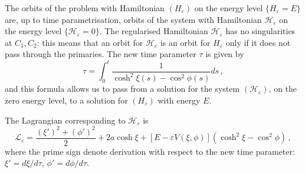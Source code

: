 \documentclass[a4paper]{article}
\begin{document}
The orbits of the problem with Hamiltonian $(H_{\varepsilon})$ on the
energy level $\{H_{\varepsilon}=E\}$ are, up to time parametrisation,
orbits of the system with Hamiltonian $\mathcal{H}_{\varepsilon}$ on
the energy level $\{\mathcal{H}_{\varepsilon}=0\}$. The regularised
Hamiltonian $\mathcal{H}_{\varepsilon}$ has no singularities at
$C_1,C_2$: this means that an orbit for $\mathcal{H}_{\varepsilon}$ is
an orbit for $H_{\varepsilon}$ only if it does not pass through the
primaries.  The new time parameter $\tau$ is given by
\begin{equation}
  \label{newtime}
  \tau=\int_0^t\frac{1}{\cosh^2\xi(s)-\cos^2\phi(s)}ds\,,
\end{equation}
and this formula allows us to pass from a solution for the system
$(\mathcal{H}_{\varepsilon})$, on the zero energy level, to a solution
for $(H_{\varepsilon})$ with energy $E$.

The Lagrangian corresponding to $\mathcal{H}_{\varepsilon}$ is
\[
\mathcal{L}_\varepsilon = \frac{(\xi')^2  + (\phi')^2}{2} +
2 a \cosh \xi  + \left[E-\varepsilon V(\xi,\phi)\right]
(\cosh^2 \xi - \cos^2\phi)\,,
\]
where the prime sign denote derivation with respect to the new time
parameter: $\xi'=d\xi/d\tau$, $\phi'=d\phi/d\tau$.
\end{document}
